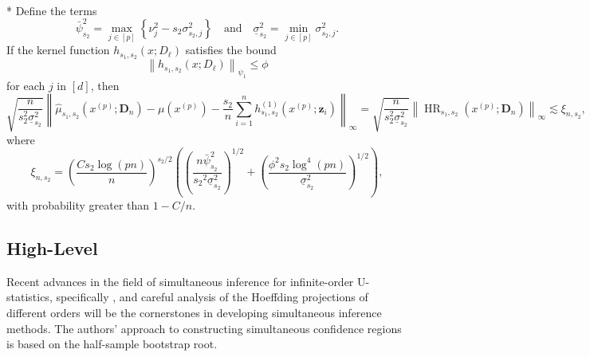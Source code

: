 \begin{boxD}
	\begin{thm}\label{thm:rit4_2}\mbox{}\\*
		Define the terms
		\begin{equation}
			\bar{\psi}_{s_2}^2
			= \max_{j \in[p]}\left\{\nu_j^2- s_2 \sigma_{s_2, j}^2\right\}
			\quad \text {and} \quad
			\underline{\sigma}_{s_2}^2
			= \min_{j \in[p]} \sigma_{s_2, j}^2.
		\end{equation}
		If the kernel function $h_{s_1, s_2}\left(x ; D_{\ell}\right)$ satisfies the bound
		\begin{equation}
			\left\|h_{s_1, s_2}\left(x ; D_{\ell}\right)\right\|_{\psi_1} \leq \phi
		\end{equation}
		for each $j$ in $[d]$, then
		\begin{equation}
			\sqrt{\frac{n}{s_2^2 \underline{\sigma}_{s_2}^2}}
			\left\|\hat{\mu}_{s_1, s_2}(x^{(p)}; \mathbf{D}_n) - \mu(x^{(p)}) - \frac{s_2}{n} \sum_{i=1}^n h^{(1)}_{s_1, s_2}(x^{(p)}; \mathbf{z}_{i})\right\|_{\infty}
			= \sqrt{\frac{n}{s_2^2 \underline{\sigma}_{s_2}^2}} \left\|\operatorname{HR}_{s_1, s_2}(x^{(p)}; \mathbf{D}_n)\right\|_{\infty}
			\lesssim \xi_{n, s_2},
		\end{equation}
		where
		\begin{equation}
			\xi_{n, s_2}
			= \left(\frac{C s_2 \log(p n)}{n}\right)^{s_2 / 2}\left(\left(\frac{n \bar{\psi}_{s_2}^2}{{s_2}^2 \underline{\sigma}_{s_2}^2}\right)^{1 / 2}+\left(\frac{\phi^2 s_2 \log ^4(p n)}{\underline{\sigma}_{s_2}^2}\right)^{1 / 2}\right),
		\end{equation}
		with probability greater than $1-C / n$.
	\end{thm}
\end{boxD}

\subsection{High-Level}
Recent advances in the field of simultaneous inference for infinite-order U-statistics, specifically \citet{ritzwoller_simultaneous_2024}, and careful analysis of the Hoeffding projections of different orders will be the cornerstones in developing simultaneous inference methods.
The authors' approach to constructing simultaneous confidence regions is based on the half-sample bootstrap root.

